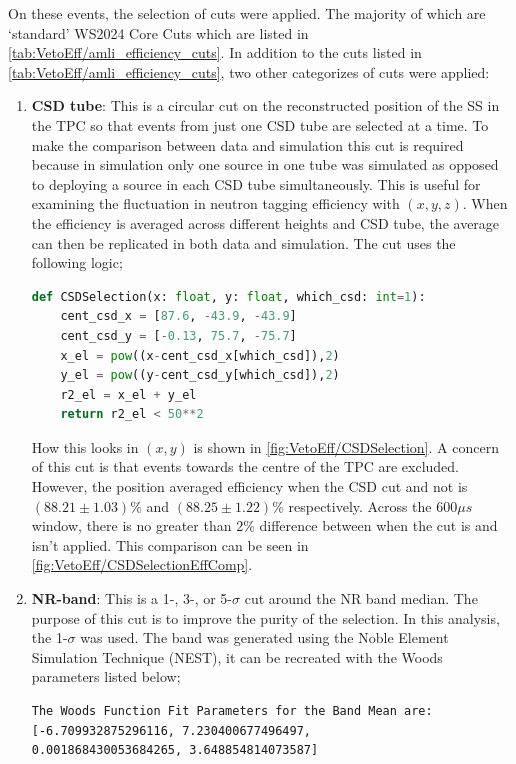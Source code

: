On these events, the selection of cuts were applied.
The majority of which are `standard' WS2024 Core Cuts which are listed in \autoref{tab:VetoEff/amli_efficiency_cuts}.
In addition to the cuts listed in \autoref{tab:VetoEff/amli_efficiency_cuts}, two other categorizes of cuts were applied:
\begin{enumerate}
	\item \textbf{CSD tube}: This is a circular cut on the reconstructed position of the SS in the TPC so that events from just one CSD tube are selected at a time.
	To make the comparison between data and simulation this cut is required because in simulation only one source in one tube was simulated as opposed to deploying a source in each CSD tube simultaneously.
	This is useful for examining the fluctuation in neutron tagging efficiency with $(x,y,z)$.
	When the efficiency is averaged across different heights and CSD tube, the average can then be replicated in both data and simulation. The cut uses the following logic;  
\begin{lstlisting}[backgroundcolor=\color{lightgray},language=Python]
def CSDSelection(x: float, y: float, which_csd: int=1):
    cent_csd_x = [87.6, -43.9, -43.9]
    cent_csd_y = [-0.13, 75.7, -75.7]
    x_el = pow((x-cent_csd_x[which_csd]),2)
    y_el = pow((y-cent_csd_y[which_csd]),2)
    r2_el = x_el + y_el
    return r2_el < 50**2
\end{lstlisting}
	      How this looks in $(x,y)$ is shown in \autoref{fig:VetoEff/CSDSelection}.
	      A concern of this cut is that events towards the centre of the TPC are excluded.
	      However, the position averaged efficiency when the CSD cut and not is $(88.21\pm1.03)\%$ and  $(88.25\pm1.22)\%$ respectively.
	      Across the $600\mu s$ window, there is no greater than $2\%$ difference between when the cut is and isn't applied.
	      This comparison can be seen in \autoref{fig:VetoEff/CSDSelectionEffComp}.
	\item \textbf{NR-band}: This is a 1-, 3-, or 5-$\sigma$ cut around the NR band median.
	      The purpose of this cut is to improve the purity of the selection.
	      In this analysis, the 1-$\sigma$ was used.
		  The band was generated using the Noble Element Simulation Technique (NEST), it can be recreated with the Woods parameters listed below;
\begin{lstlisting}[backgroundcolor = \color{lightgray}]
The Woods Function Fit Parameters for the Band Mean are:
[-6.709932875296116, 7.230400677496497,
0.001868430053684265, 3.648854814073587]


\end{lstlisting}
\end{enumerate}
